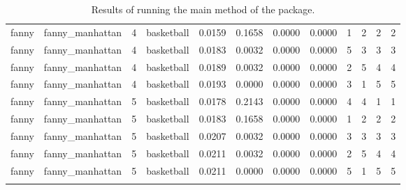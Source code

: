 \documentclass[
]{article}
\begin{document}
\begin{longtable}{| p{1.1cm} | p{2cm} | p{0.8cm} | p{1.3cm} | p{0.60cm} | p{0.7cm} | p{0.65cm} | p{0.65cm} | p{0.65cm} | p{0.65cm} | p{0.7cm} | p{0.65cm} |}
\scriptsize   fanny   & \scriptsize  fanny\_manhattan & \scriptsize    4    & \scriptsize basketball & \scriptsize    0.0159  &  \scriptsize 0.1658 & \scriptsize 0.0000 & \scriptsize    0.0000 & \scriptsize   1  & \scriptsize    2  & \scriptsize    2  & \scriptsize    2 \\
\scriptsize   fanny   & \scriptsize  fanny\_manhattan & \scriptsize    4    & \scriptsize basketball & \scriptsize    0.0183  &  \scriptsize 0.0032 & \scriptsize 0.0000 & \scriptsize    0.0000 & \scriptsize   5  & \scriptsize    3  & \scriptsize    3  & \scriptsize    3 \\
\scriptsize   fanny   & \scriptsize  fanny\_manhattan & \scriptsize    4    & \scriptsize basketball & \scriptsize    0.0189  &  \scriptsize 0.0032 & \scriptsize 0.0000 & \scriptsize    0.0000 & \scriptsize   2  & \scriptsize    5  & \scriptsize    4  & \scriptsize    4 \\
\scriptsize   fanny   & \scriptsize  fanny\_manhattan & \scriptsize    4    & \scriptsize basketball & \scriptsize    0.0193  &  \scriptsize 0.0000 & \scriptsize 0.0000 & \scriptsize    0.0000 & \scriptsize   3  & \scriptsize    1  & \scriptsize    5  & \scriptsize    5 \\
\cline{3-12}
\scriptsize   fanny   & \scriptsize  fanny\_manhattan & \scriptsize    5    & \scriptsize basketball & \scriptsize    0.0178  &  \scriptsize 0.2143 & \scriptsize 0.0000 & \scriptsize    0.0000 & \scriptsize   4  & \scriptsize    4  & \scriptsize    1  & \scriptsize    1 \\
\scriptsize   fanny   & \scriptsize  fanny\_manhattan & \scriptsize    5    & \scriptsize basketball & \scriptsize    0.0183  &  \scriptsize 0.1658 & \scriptsize 0.0000 & \scriptsize    0.0000 & \scriptsize   1  & \scriptsize    2  & \scriptsize    2  & \scriptsize    2 \\
\scriptsize   fanny   & \scriptsize  fanny\_manhattan & \scriptsize    5    & \scriptsize basketball & \scriptsize    0.0207  &  \scriptsize 0.0032 & \scriptsize 0.0000 & \scriptsize    0.0000 & \scriptsize   3  & \scriptsize    3  & \scriptsize    3  & \scriptsize    3 \\
\scriptsize   fanny   & \scriptsize  fanny\_manhattan & \scriptsize    5    & \scriptsize basketball & \scriptsize    0.0211  &  \scriptsize 0.0032 & \scriptsize 0.0000 & \scriptsize    0.0000 & \scriptsize   2  & \scriptsize    5  & \scriptsize    4  & \scriptsize    4 \\
\scriptsize   fanny   & \scriptsize  fanny\_manhattan & \scriptsize    5    & \scriptsize basketball & \scriptsize    0.0211  &  \scriptsize 0.0000 & \scriptsize 0.0000 & \scriptsize    0.0000 & \scriptsize   5  & \scriptsize    1  & \scriptsize    5  & \scriptsize    5 \\
\hline
\caption{Results of running the main method of the package.}
\label{tab:clustering}
\end{longtable}
\end{document}
